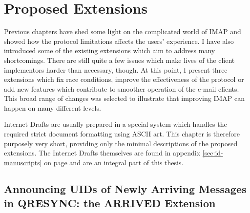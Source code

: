 \documentclass[trojita]{subfiles}
\begin{document}
\chapter{Proposed Extensions}

Previous chapters have shed some light on the complicated world of IMAP and showed how the protocol limitations affects
the users' experience.  I have also introduced some of the existing extensions which aim to address many shortcomings.
There are still quite a few issues which make lives of the client implementors harder than necessary, though.  At this
point, I present three extensions which fix race conditions, improve the effectiveness of the protocol or add new
features which contribute to smoother operation of the e-mail clients.  This broad range of changes was selected to
illustrate that improving IMAP can happen on many different levels.

Internet Drafts are usually prepared in a special system \cite{rfc-formatting} which handles the required strict
document formatting using ASCII art.  This chapter is therefore purposely very short, providing only the minimal
descriptions of the proposed extensions.  The Internet Drafts themselves are found in appendix \ref{sec:id-manuscripts}
on page \pageref{sec:id-manuscripts} and are an integral part of this thesis.

\section{Announcing UIDs of Newly Arriving Messages in QRESYNC: the ARRIVED Extension}
\label{sec:draft-arrived}
\end{document}
